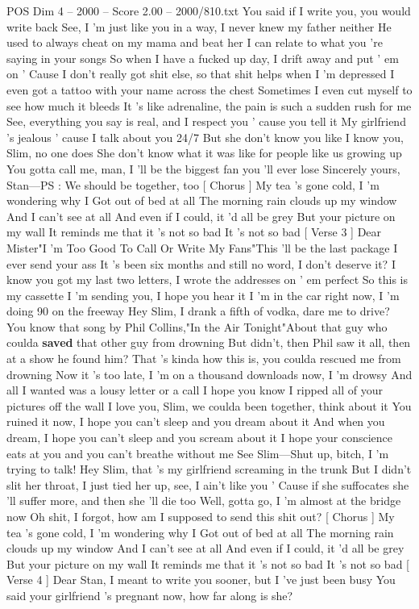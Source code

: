 \begin{textsample}{POS Dim 4 – 2000 – Score 2.00 – 2000/810.txt}
You said if I write you, you would write back See, I 'm just like you in a way, I never knew my father neither He used to always cheat on my mama and beat her I can relate to what you 're saying in your songs So when I have a fucked up day, I drift away and put ' em on ' Cause I don't really got shit else, so that shit helps when I 'm depressed I even got a tattoo with your name across the chest Sometimes I even cut myself to see how much it bleeds It 's like adrenaline, the pain is such a sudden rush for me See, everything you say is real, and I respect you ' cause you tell it My girlfriend 's jealous ' cause I talk about you 24/7 But she don't know you like I know you, Slim, no one does She don't know what it was like for people like us growing up You gotta call me, man, I 'll be the biggest fan you 'll ever lose Sincerely yours, Stan—PS : We should be together, too [ Chorus ] My tea 's gone cold, I 'm wondering why I Got out of bed at all The morning rain clouds up my window And I can't see at all And even if I could, it 'd all be grey But your picture on my wall It reminds me that it 's not so bad It 's not so bad [ Verse 3 ] Dear Mister"I 'm Too Good To Call Or Write My Fans"This 'll be the last package I ever send your ass It 's been six months and still no word, I don't deserve it?
I know you got my last two letters, I wrote the addresses on ' em perfect So this is my cassette I 'm sending you, I hope you hear it I 'm in the car right now, I 'm doing 90 on the freeway Hey Slim, I drank a fifth of vodka, dare me to drive?
You know that song by Phil Collins,"In the Air Tonight"About that guy who coulda \textbf{saved} that other guy from drowning But didn't, then Phil saw it all, then at a show he found him?
That 's kinda how this is, you coulda rescued me from drowning Now it 's too late, I 'm on a thousand downloads now, I 'm drowsy And all I wanted was a lousy letter or a call I hope you know I ripped all of your pictures off the wall I love you, Slim, we coulda been together, think about it You ruined it now, I hope you can't sleep and you dream about it And when you dream, I hope you can't sleep and you scream about it I hope your conscience eats at you and you can't breathe without me See Slim—Shut up, bitch, I 'm trying to talk!
Hey Slim, that 's my girlfriend screaming in the trunk But I didn't slit her throat, I just tied her up, see, I ain't like you ' Cause if she suffocates she 'll suffer more, and then she 'll die too Well, gotta go, I 'm almost at the bridge now Oh shit, I forgot, how am I supposed to send this shit out? [ Chorus ] My tea 's gone cold, I 'm wondering why I Got out of bed at all The morning rain clouds up my window And I can't see at all And even if I could, it 'd all be grey But your picture on my wall It reminds me that it 's not so bad It 's not so bad [ Verse 4 ] Dear Stan, I meant to write you sooner, but I 've just been busy You said your girlfriend 's pregnant now, how far along is she?

\end{textsample}
